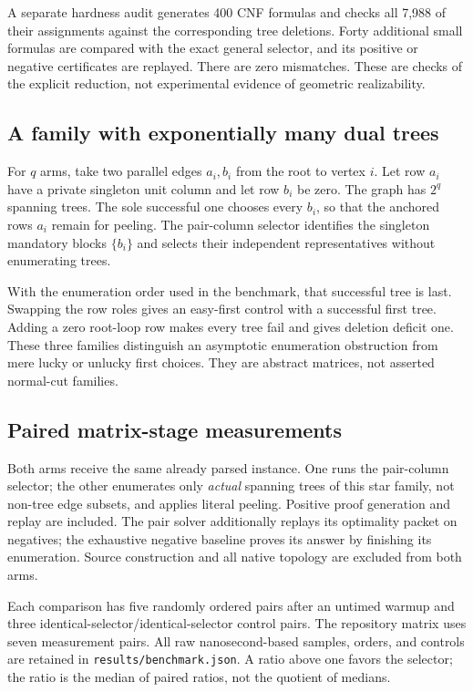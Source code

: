 \documentclass[11pt,letterpaper]{article}
\theoremstyle{definition}
\theoremstyle{remark}
\newcommand{\code}[1]{\nolinkurl{#1}}
\begin{document}
A separate hardness audit generates 400 CNF formulas and checks all 7,988 of
their assignments against the corresponding tree deletions. Forty additional
small formulas are compared with the exact general selector, and its positive
or negative certificates are replayed. There are zero mismatches. These are
checks of the explicit reduction, not experimental evidence of geometric
realizability.

\subsection{A family with exponentially many dual trees}
For $q$ arms, take two parallel edges $a_i,b_i$ from the root to vertex $i$.
Let row $a_i$ have a private singleton unit column and let row $b_i$ be zero.
The graph has $2^q$ spanning trees. The sole successful one chooses every $b_i$,
so that the anchored rows $a_i$ remain for peeling. The pair-column selector
identifies the singleton mandatory blocks $\{b_i\}$ and selects their
independent representatives without enumerating trees.

With the enumeration order used in the benchmark, that successful tree is last.
Swapping the row roles gives an easy-first control with a successful first tree.
Adding a zero root-loop row makes every tree fail and gives deletion deficit one.
These three families distinguish an asymptotic enumeration obstruction from
mere lucky or unlucky first choices. They are abstract matrices, not asserted
normal-cut families.

\subsection{Paired matrix-stage measurements}
Both arms receive the same already parsed instance. One runs the pair-column
selector; the other enumerates only \emph{actual} spanning trees of this star
family, not non-tree edge subsets, and applies literal peeling. Positive proof
generation and replay are included. The pair solver additionally replays its
optimality packet on negatives; the exhaustive negative baseline proves its
answer by finishing its enumeration. Source construction and all native topology
are excluded from both arms.

Each comparison has five randomly ordered pairs after an untimed warmup and
three identical-selector/identical-selector control pairs. The repository matrix
uses seven measurement pairs. All raw nanosecond-based samples, orders, and
controls are retained in \code{results/benchmark.json}. A ratio above one favors
the selector; the ratio is the median of paired ratios, not the quotient of
medians.
\end{document}
